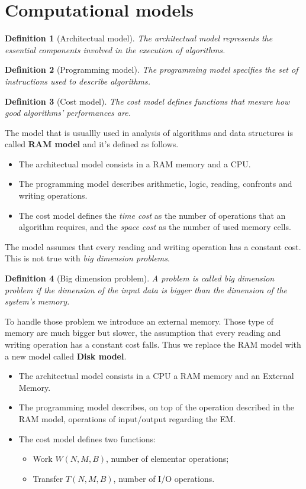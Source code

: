 \documentclass{report}
\newtheorem{defin}{Definition}[chapter]
\begin{document}
\section{Computational models}
\begin{defin}[Architectual model]
    The architectual model represents the essential components involved in the execution of algorithms.
\end{defin}
\begin{defin}[Programming model]
    The programming model specifies the set of instructions used to describe algorithms.
\end{defin}
\begin{defin}[Cost model]
    The cost model defines functions that mesure how good algorithms' performances are.
\end{defin}
\noindent
The model that is usuallly used in analysis of algorithms and data structures is called \textbf{RAM model} and it's defined as follows.
\begin{itemize}
    \item The architectual model consists in a RAM memory and a CPU.
    \item The programming model describes arithmetic, logic, reading, confronts and writing operations.
    \item The cost model defines the \textit{time cost} as the number of operations that an algorithm requires, and the \textit{space cost} as the number of used memory cells. 
\end{itemize}
The model assumes that every reading and writing operation has a constant cost. This is not true with \textit{big dimension problems}.
\begin{defin}[Big dimension problem]
    A problem is called \textit{big dimension problem} if the dimension of the input data is bigger than the dimension of the system's memory.
\end{defin}
\noindent
To handle those problem we introduce an external memory. Those type of memory are much bigger but slower, the assumption that every reading and writing operation has a constant cost falls. Thus we replace the RAM model with a new model called \textbf{Disk model}.
\begin{itemize}
    \item The architectual model consists in a CPU a RAM memory and an External Memory.
    \item The programming model describes, on top of the operation described in the RAM model, operations of input/output regarding the EM.
    \item The cost model defines two functions:
    \begin{itemize}
        \item Work \(W(N,M,B)\), number of elementar operations;
        \item Transfer \(T(N,M,B)\), number of I/O operations.
    \end{itemize}
\end{itemize}
\end{document}
